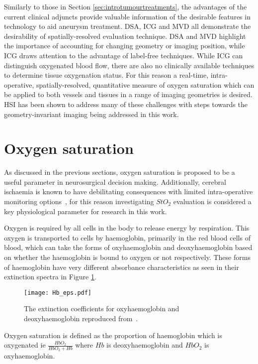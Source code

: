 Similarly to those in Section \ref{sec:introtumourtreatments}, the advantages of the current clinical adjuncts provide valuable information of the desirable features in technology to aid aneurysm treatment. DSA, ICG and MVD all demonstrate the desirability of spatially-resolved evaluation technique. DSA and MVD highlight the importance of accounting for changing geometry or imaging position, while ICG draws attention to the advantage of label-free techniques. While ICG can distinguish oxygenated blood flow, there are also no clinically available techniques to determine tissue oxygenation status. For this reason a real-time, intra-operative, spatially-resolved, quantitative measure of oxygen saturation which can be applied to both vessels and tissues in a range of imaging geometries is desired. HSI has been shown to address many of these challenges with steps towards the geometry-invariant imaging being addressed in this work. 

\section{Oxygen saturation}\label{sec:oxygensat}
As discussed in the previous sections, oxygen saturation is proposed to be a useful parameter in neurosurgical decision making. Additionally, cerebral ischaemia is known to have debilitating consequences with limited intra-operative monitoring options~\cite{Zhou2016}, for this reason investigating $StO_2$ evaluation is considered a key physiological parameter for research in this work. 

Oxygen is required by all cells in the body to release energy by respiration. This oxygen is transported to cells by haemoglobin, primarily in the red blood cells of blood, which can take the forms of oxyhaemoglobin and deoxyhaemoglobin based on whether the haemoglobin is bound to oxygen or not respectively. These forms of haemoglobin have very different absorbance characteristics as seen in their extinction spectra in Figure \ref{fig:Haemoglobinext}. 
\begin{figure}[h]
    \centering 
    \texttt{[image: Hb\_eps.pdf]}
    \caption{The extinction coefficients for oxyhaemoglobin and deoxyhaemoglobin reproduced from~.}
    \label{fig:Haemoglobinext}
\end{figure}
Oxygen saturation is defined as the proportion of haemoglobin which is oxygenated ie $\frac{HbO_2}{HbO_2 + Hb}$ where $Hb$ is deoxyhaemoglobin and $HbO_2$ is oxyhaemoglobin. 

